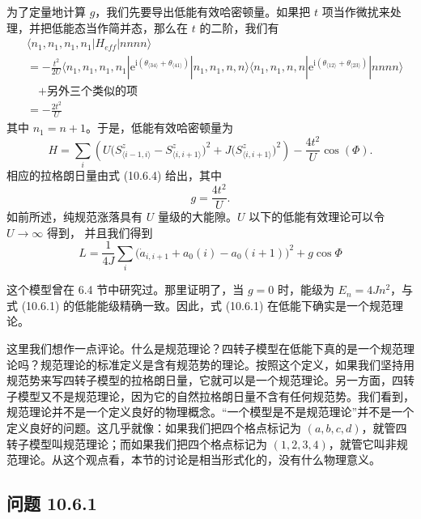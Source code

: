 为了定量地计算 $g$，我们先要导出低能有效哈密顿量。如果把 $t$ 项当作微扰来处理，并把低能态当作简并态，那么在 $t$ 的二阶，我们有
\begin{align*}
&\langle n_{1},n_{1},n_{1},n_{1}|H_{eff}|nnnn\rangle\\
&=-\frac{t^{2}}{2U}\langle n_{1},n_{1},n_{1},n_{1}|\mathrm{e}^{\mathrm{i}(\theta_{\langle34\rangle}+\theta_{\langle41\rangle})}|n_{1},n_{1},n,n\rangle\langle n_{1},n_{1},n,n|\mathrm{e}^{\mathrm{i}(\theta_{\langle12\rangle}+\theta_{\langle23\rangle})}|nnnn\rangle\\
&\quad+\text{另外三个类似的项}\\
&=-\frac{2t^{2}}{U}
\end{align*}
其中 $n_{1}=n+1$。于是，低能有效哈密顿量为
\begin{equation*}
H=\sum_{i}\left(U\big(S_{\langle i-1,i\rangle}^{z}-S_{\langle i,i+1\rangle}^{z}\big)^{2}+J\big(S_{\langle i,i+1\rangle}^{z}\big)^{2}\right)-\frac{4t^{2}}{U}\cos(\Phi).
\end{equation*}
相应的拉格朗日量由式 (10.6.4) 给出，其中
\begin{equation*}
g=\frac{4t^{2}}{U}.
\end{equation*}
如前所述，纯规范涨落具有 $U$ 量级的大能隙。$U$ 以下的低能有效理论可以令 $U\to\infty$ 得到，
并且我们得到
\begin{equation*}
L=\frac{1}{4J}\sum_{i}\big(\dot a_{i,i+1}+a_0(i)-a_0(i+1)\big)^{2}+g\cos\Phi \tag{10.6.5}
\end{equation*}

这个模型曾在 6.4 节中研究过。那里证明了，当 $g=0$ 时，能级为 $E_{n}=4Jn^{2}$，与式 (10.6.1) 的低能能级精确一致。因此，式 (10.6.1) 在低能下确实是一个规范理论。

这里我们想作一点评论。什么是规范理论？四转子模型在低能下真的是一个规范理论吗？规范理论的标准定义是含有规范势的理论。按照这个定义，如果我们坚持用规范势来写四转子模型的拉格朗日量，它就可以是一个规范理论。另一方面，四转子模型又不是规范理论，因为它的自然拉格朗日量不含有任何规范势。我们看到，规范理论并不是一个定义良好的物理概念。“一个模型是不是规范理论”并不是一个定义良好的问题。这几乎就像：如果我们把四个格点标记为 $(a,b,c,d)$，就管四转子模型叫规范理论；而如果我们把四个格点标记为 $(1,2,3,4)$，就管它叫非规范理论。从这个观点看，本节的讨论是相当形式化的，没有什么物理意义。

\subsection*{问题 10.6.1}

